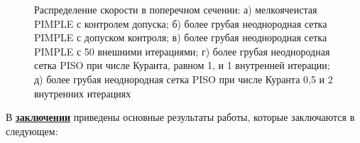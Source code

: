 \begin{figure}[h]
	\caption{Распределение скорости в поперечном сечении: а) мелкоячеистая PIMPLE с контролем допуска; б) более грубая неоднородная сетка PIMPLE с допуском контроля; в) более грубая неоднородная сетка PIMPLE с 50 внешними итерациями; г) более грубая неоднородная сетка PISO при числе Куранта, равном 1, и 1 внутренней итерации; д) более грубая неоднородная сетка PISO при числе Куранта 0,5 и 2 внутренних итерациях }
	\label{fig:surf_velocity}
\end{figure}



\FloatBarrier
{}                                  %
В \underline{\textbf{заключении}} приведены основные результаты работы, которые заключаются в следующем:



